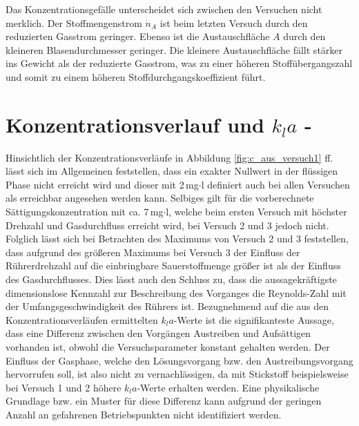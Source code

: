 \documentclass[12pt,liststotoc]{report}
\begin{document}
Das Konzentrationsgefälle unterscheidet sich zwischen den Versuchen nicht merklich. Der Stoffmengenstrom $\dot{n}_A$ ist beim letzten Versuch durch den reduzierten Gasstrom geringer. Ebenso ist die Austauschfläche $A$ durch den kleineren Blasendurchmesser geringer. Die kleinere Austauschfläche fällt stärker ins Gewicht als der reduzierte Gasstrom, was zu einer höheren Stoffübergangszahl und somit zu einem höheren Stoffdurchgangskoeffizient führt. 

\section{Konzentrationsverlauf und $k_la$ - }

Hinsichtlich der Konzentrationsverläufe in Abbildung \ref{fig:c_aus_versuch1} ff. lässt sich im Allgemeinen feststellen, dass ein exakter Nullwert in der flüssigen Phase nicht erreicht wird und dieser mit 2\,mg$\cdot$l definiert auch bei allen Versuchen als erreichbar angesehen werden kann. Selbiges gilt für die vorberechnete Sättigungskonzentration mit ca. 7\,mg$\cdot$l, welche beim ersten Versuch mit höchster Drehzahl und Gasdurchfluss erreicht wird, bei Versuch 2 und 3 jedoch nicht. Folglich lässt sich bei Betrachten des Maximums von Versuch 2 und 3 feststellen, dass aufgrund des größeren Maximums bei Versuch 3 der Einfluss der Rührerdrehzahl auf die einbringbare Sauerstoffmenge größer ist als der Einfluss des Gasdurchflusses. Dies lässt auch den Schluss zu, dass die aussagekräftigste dimensionslose Kennzahl zur Beschreibung des Vorganges die Reynolds-Zahl mit der Umfangsgeschwindigkeit des Rührers ist. Bezugnehmend auf die aus den Konzentrationsverläufen ermittelten $k_la$-Werte ist die signifikanteste Aussage, dass eine Differenz zwischen den Vorgängen Austreiben und Aufsättigen vorhanden ist, obwohl die Versuchsparameter konstant gehalten werden. Der Einfluss der Gasphase, welche den Lösungsvorgang bzw. den Austreibungsvorgang hervorrufen soll, ist also nicht zu vernachlässigen, da mit Stickstoff beispielsweise bei Versuch 1 und 2 höhere $k_la$-Werte erhalten werden. Eine physikalische Grundlage bzw. ein Muster für diese Differenz kann aufgrund der geringen Anzahl an gefahrenen Betriebspunkten nicht identifiziert werden.
\\
\\
\end{document}
